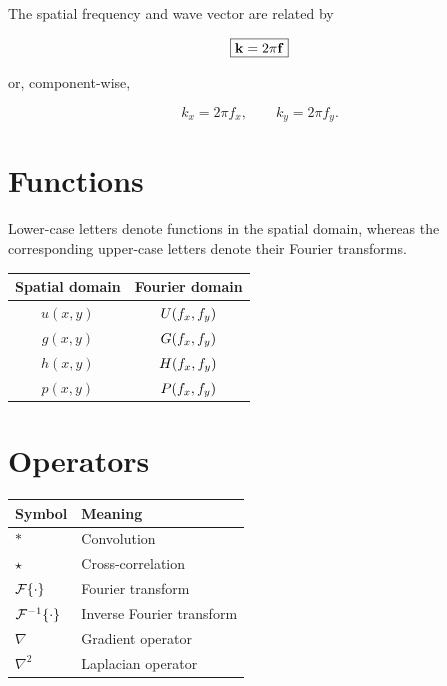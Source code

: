 The spatial frequency and wave vector are related by

\[
\boxed{\mathbf{k} = 2\pi\mathbf{f}}
\]

or, component-wise,

\[
k_x=2\pi f_x,\qquad
k_y=2\pi f_y.
\]
\pagebreak

\section{Functions}

Lower-case letters denote functions in the spatial domain, whereas the corresponding upper-case letters denote their Fourier transforms.

\begin{center}
\begin{tabular}{cc}
\toprule
Spatial domain & Fourier domain\\
\midrule
$u(x,y)$ & $U(f_x,f_y)$\\
$g(x,y)$ & $G(f_x,f_y)$\\
$h(x,y)$ & $H(f_x,f_y)$\\
$p(x,y)$ & $P(f_x,f_y)$\\
\bottomrule
\end{tabular}
\end{center}


\section{Operators}

\begin{center}
\begin{tabular}{ll}
\toprule
Symbol & Meaning\\
\midrule
$*$ & Convolution\\
$\star$ & Cross-correlation\\
$\mathcal{F}\{\cdot\}$ & Fourier transform\\
$\mathcal{F}^{-1}\{\cdot\}$ & Inverse Fourier transform\\
$\nabla$ & Gradient operator\\
$\nabla^2$ & Laplacian operator\\
\bottomrule
\end{tabular}
\end{center}


